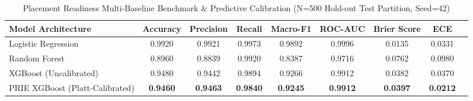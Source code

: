 \begin{table}[htbp]
\centering
\caption{Placement Readiness Multi-Baseline Benchmark & Predictive Calibration (N=500 Hold-out Test Partition, Seed=42)}
\label{tab:model_performance}
\begin{tabular}{lcccccccc}
\hline
\textbf{Model Architecture} & \textbf{Accuracy} & \textbf{Precision} & \textbf{Recall} & \textbf{Macro-F1} & \textbf{ROC-AUC} & \textbf{Brier Score} & \textbf{ECE} \\
\hline
Logistic Regression & 0.9920 & 0.9921 & 0.9973 & 0.9892 & 0.9996 & 0.0135 & 0.0331 \\
Random Forest & 0.8960 & 0.8839 & 0.9920 & 0.8387 & 0.9716 & 0.0762 & 0.0980 \\
XGBoost (Uncalibrated) & 0.9480 & 0.9442 & 0.9894 & 0.9266 & 0.9912 & 0.0382 & 0.0370 \\
PRIE XGBoost (Platt-Calibrated) & \textbf{0.9460} & \textbf{0.9463} & \textbf{0.9840} & \textbf{0.9245} & \textbf{0.9912} & \textbf{0.0397} & \textbf{0.0212} \\
\hline
\end{tabular}
\end{table}
